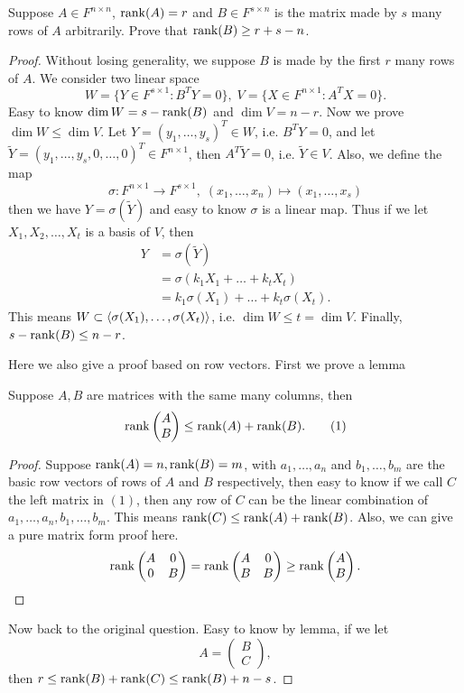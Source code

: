 \begin{pro}%
	Suppose $A\in F^{n\times n}$, $\operatorname*{rank}(A)=r$ and $B\in F^{s\times n}$ is the matrix made by $s$ many rows of $A$
	arbitrarily. Prove that $\operatorname*{rank}(B)\geq r+s-n$.
\end{pro}
\begin{proof}
	Without losing generality, we suppose $B$ is made by the first $r$ many rows of $A$. We consider two linear space
	\[W=\{Y\in F^{s\times 1}\colon B^T Y=0\},\;V=\{X\in F^{n\times 1}\colon A^T X=0\}.\]
	Easy to know $\dim W=s-\operatorname*{rank}(B)$ and $\dim V=n-r$. Now we prove $\dim W\leq \dim V$.
	Let $Y=(y_1,\dots, y_s)^T\in W$, i.e. $B^TY=0$, and let $\widetilde{Y}=(y_1,\dots,y_s,0,\dots,0)^T\in F^{n\times 1}$,
	then $A^T \widetilde{Y}=0$, i.e. $\widetilde{Y}\in V$. Also, we define the map
	\[\sigma: F^{n\times 1}\to F^{s\times 1},\; (x_1,\dots,x_n)\mapsto (x_1,\dots,x_s)\]
	then we have $Y=\sigma(\widetilde{Y})$ and easy to know $\sigma$ is a linear map.
	Thus if we let $X_1,X_2,\dots,X_t$ is a basis of $V$, then
	\begin{align*}
	Y&=\sigma(\widetilde{Y})\\
	 &=\sigma(k_1X_1+\dots+k_t X_t)\\
	 &=k_1\sigma(X_1)+\dots+k_t \sigma(X_t).
	\end{align*}
	This means $W\subset \left\langle \sigma(X_1),\dots,\sigma(X_t)\right\rangle$, i.e. $\dim W\leq t=\dim V$.
	Finally, $s-\operatorname*{rank}(B)\leq n-r$.

	Here we also give a proof based on row vectors. First we prove a lemma
	\begin{lem}
		Suppose $A,B$ are matrices with the same many columns, then 
		\[\operatorname*{rank} \begin{pmatrix} A\\ B\end{pmatrix}\leq \operatorname*{rank}(A)+\operatorname*{rank}(B).\tag{1}\]
	\end{lem}
	\begin{proof}
		Suppose $\operatorname*{rank}(A)=n,\operatorname*{rank}(B)=m$, with $a_1,\dots,a_n$ and $b_1,\dots,b_m$ are the basic row vectors of rows of $A $ and $B$ respectively, then easy to know if we call $C$ the left matrix in $(1)$, then any row of $C$ can be the linear combination of $a_1,\dots,a_n,b_1,\dots,b_m$. This means $\operatorname*{rank}(C)\leq \operatorname*{rank}(A)+\operatorname*{rank}(B)$. Also, we can give a pure matrix form proof here.
		\[\operatorname*{rank}\begin{pmatrix} A & 0\\0 & B\end{pmatrix}= \operatorname*{rank}\begin{pmatrix} A & 0\\B & B\end{pmatrix}
		\geq \operatorname*{rank}\begin{pmatrix} A\\B\end{pmatrix}.\]
	\end{proof}
	Now back to the original question. Easy to know by lemma, if we let
	\[A=\begin{pmatrix} B\\ C\end{pmatrix},\]
	then $r\leq \operatorname*{rank}(B)+\operatorname*{rank}(C)\leq \operatorname*{rank}(B)+n-s$.
\end{proof}

